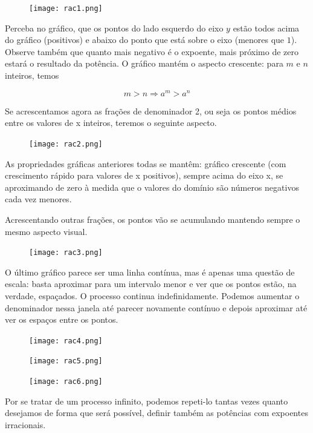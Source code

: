 \begin{figure}[H]
\centering
\texttt{[image: rac1.png]}
\end{figure}

Perceba no gráfico, que os pontos do lado esquerdo do eixo $y$ estão todos acima do gráfico (positivos) e abaixo do ponto que está sobre o eixo (menores que $1$). Observe também que quanto mais negativo é o expoente, mais próximo de zero estará o resultado da potência. O gráfico mantém o aspecto crescente: para $m$ e $n$ inteiros, temos

\[
m>n \Rightarrow a^{m}>a^{n}
\]

Se acrescentamos agora as frações de denominador 2, ou seja os pontos médios entre os valores de x inteiros, teremos o seguinte aspecto.

\begin{figure}[H]
\centering
\texttt{[image: rac2.png]}
\end{figure}

As propriedades gráficas anteriores todas se mantêm: gráfico crescente (com crescimento rápido para valores de x positivos), sempre acima do eixo x, se aproximando de zero à medida que o valores do domínio são números negativos cada vez menores.

Acrescentando outras frações, os pontos vão se acumulando mantendo sempre o mesmo aspecto visual.

\begin{figure}[H]
\centering
\texttt{[image: rac3.png]}
\end{figure}

O último gráfico parece ser uma linha contínua, mas é apenas uma questão de escala: basta aproximar para um intervalo menor e ver que os pontos estão, na verdade, espaçados. O processo continua indefinidamente. Podemos aumentar o denominador nessa janela até parecer novamente contínuo e depois aproximar até ver os espaços entre os pontos.

\begin{figure}[H]
\centering
\texttt{[image: rac4.png]}
\end{figure}

\begin{figure}[H]
\centering
\texttt{[image: rac5.png]}
\end{figure}

\begin{figure}[H]
\centering
\texttt{[image: rac6.png]}
\end{figure}

Por se tratar de um processo infinito, podemos repeti-lo tantas vezes quanto desejamos de forma que será possível, definir também as potências com expoentes irracionais.

